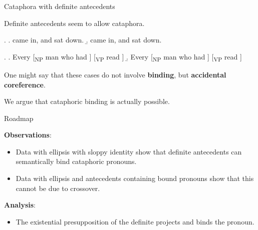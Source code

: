 \documentclass{beamer}
\begin{document}
\begin{frame}{Cataphora with definite antecedents}

Definite antecedents seem to allow \alert{cataphora}.

\ex.
  \a.  came in, and  sat down.
  \b.  came in, and  sat down.

\medskip

\ex.
  \a. Every [\textsubscript{NP} man who had ] [\textsubscript{VP} read ]
  \b. Every [\textsubscript{NP} man who had ] [\textsubscript{VP} read ]

One might say that these cases do not involve {\bf binding}, but {\bf accidental coreference}.

We argue that cataphoric binding is actually possible.


\end{frame}

\begin{frame}{Roadmap}

{\bf Observations}:
\begin{itemize}
  \item Data with \alert{ellipsis with sloppy identity} show that definite antecedents can semantically bind cataphoric pronouns.
  \item Data with ellipsis and antecedents containing bound pronouns show that this cannot be due to \alert{crossover}.
\end{itemize}

{\bf Analysis}:
\begin{itemize}
  \item The existential presupposition of the definite projects and binds the pronoun.
\end{itemize}

\end{frame}
\end{document}
